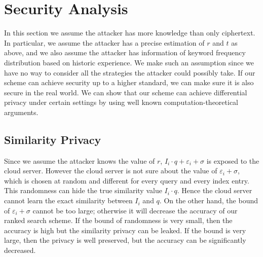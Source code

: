 \documentclass{IEEEtran}
\begin{document}
\section{Security Analysis}
In this section we assume the attacker has more knowledge than only ciphertext. In particular, we assume the attacker has a precise estimation of $r$ and $t$ as above, and we also assume the attacker has information of keyword frequency distribution based on historic experience. We make such an assumption since we have no way to consider all the strategies the attacker could possibly take. If our scheme can achieve security up to a higher standard, we can make sure it is also secure in the real world. We can show that our scheme can achieve differential privacy under certain settings by using well known computation-theoretical arguments.

\subsection{Similarity Privacy}
Since we assume the attacker knows the value of $r$, $I_i\cdot q+\varepsilon_i+\sigma$ is exposed to the cloud server. However the cloud server is not sure about the value of $\varepsilon_i+\sigma$, which is chosen at random and different for every query and every index entry. This randomness can hide the true similarity value $I_i\cdot q$. Hence the cloud server cannot learn the exact similarity between $I_i$ and $q$. On the other hand, the bound of $\varepsilon_i+\sigma$ cannot be too large; otherwise it will decrease the accuracy of our ranked search scheme. If the bound of randomness is very small, then the accuracy is high but the similarity privacy can be leaked. If the bound is very large, then the privacy is well preserved, but the accuracy can be significantly decreased.
\end{document}
